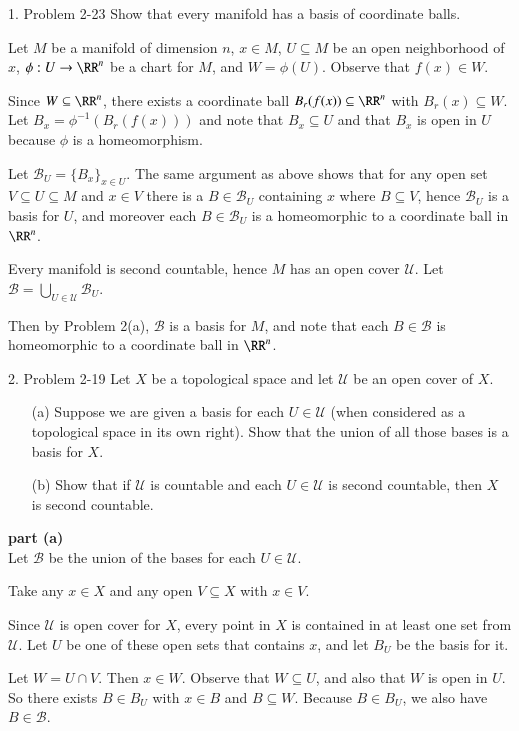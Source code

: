 \documentclass{homework}
\newcommand{\calU}{\mathcal{U}}
\newcommand{\calB}{\mathcal{B}}
\newcommand{\nextprob}{\newpage}
\newcommand{\ra}{\rightarrow}
\begin{document}
\begin{exercise}{1. Problem 2-23}
Show that every manifold has a basis of coordinate balls.
\end{exercise}
\solution
Let $M$ be a manifold of dimension $n$,
$x\in M$, $U\subseteq M$ be an open neighborhood
of $x$, $\phi:U\ra\RR^n$ be a chart for $M$, and $W=\phi(U)$. Observe
that $f(x)\in W$.

Since $W\subseteq\RR^n$, there exists a coordinate ball
$B_r(f(x))\subseteq\RR^n$ with $B_r(x)\subseteq W$.
Let $B_x=\phi^{-1}(B_r(f(x)))$ and note that $B_x\subseteq U$
and that $B_x$ is open in $U$ because
$\phi$ is a homeomorphism.

Let $\calB_U=\{B_x\}_{x\in U}$.  The same argument as above shows that
for any open set $V\subseteq U\subseteq M$ and $x\in V$ there
is a $B\in\calB_U$ containing $x$ where $B\subseteq V$, hence $\calB_U$
is a basis for $U$, and moreover each $B\in\calB_U$ is a homeomorphic
to a coordinate ball in $\RR^n$.

Every manifold is second countable, hence $M$ has an open cover $\calU$.
Let $\calB=\displaystyle\bigcup_{U\in \calU}\calB_U$.

Then by Problem 2(a), $\calB$ is a basis for $M$,
and note that each $B\in\calB$ is homeomorphic
to a coordinate ball in $\RR^n$.

\nextprob
\begin{exercise}{2. Problem 2-19}
Let $X$ be a topological space and let $\calU$ be an open cover of $X$.
\begin{itemize}
\item[(a)] Suppose we are given a basis for each $U\in\calU$ (when
considered as a topological space in its own right).  Show that the
union of all those bases is a basis for $X$.
\item[(b)] Show that if $\calU$ is countable and each $U\in\calU$
is second countable, then $X$ is second countable.
\end{itemize}
\end{exercise}
\solution
\textbf{part (a)}\\
Let $\calB$ be the union of the bases for each $U\in\calU$.

Take any $x\in X$ and any open $V\subseteq X$ with $x\in V$.

Since $\calU$ is open cover for $X$, every point in $X$ is
contained in at least one set from $\calU$.  Let $U$ be one
of these open sets that contains $x$,
and let $B_U$ be the basis for it.

Let $W=U\cap V$.  Then $x\in W$.
Observe that $W\subseteq U$, and also that $W$
is open in $U$.  So there exists $B\in B_U$ with
$x\in B$ and $B\subseteq W$.  Because $B\in B_U$, we also have
$B\in\calB$.
\end{document}
